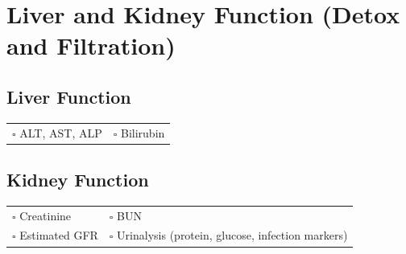 
\section{Liver and Kidney Function (Detox and Filtration)}
\label{sec:liver}

\subsection{Liver Function}

\begin{tabular}{p{9cm} p{8cm}}
$\square$ ALT, AST, ALP & $\square$ Bilirubin \\ 
\end{tabular}

\subsection{Kidney Function}

\begin{tabular}{p{9cm} p{8cm}}
$\square$ Creatinine & $\square$ BUN \\ 
$\square$ Estimated GFR & $\square$ Urinalysis (protein, glucose, infection markers) \\ 
\end{tabular}

